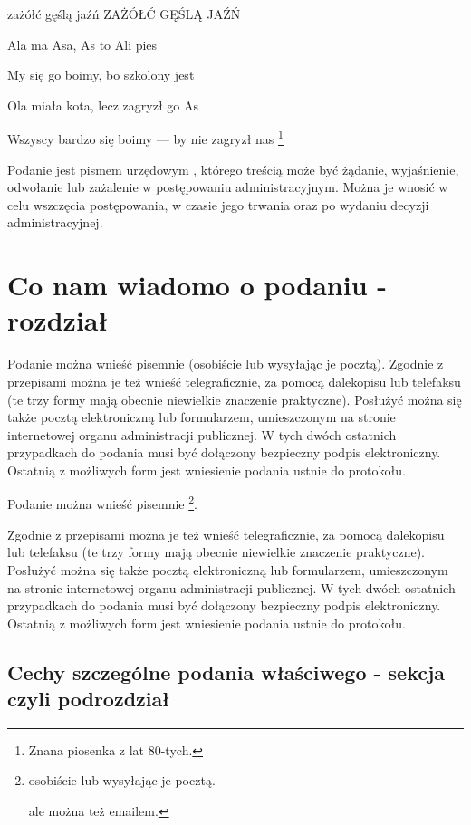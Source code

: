 zażółć gęślą jaźń ZAŻÓŁĆ GĘŚLĄ JAŹŃ

Ala ma Asa, As to Ali pies

My się go boimy, bo szkolony jest

Ola miała kota, lecz zagryzł go As

Wszyscy bardzo się boimy --- by nie zagryzł nas \footnote{Znana piosenka
  z lat 80-tych.}

Podanie jest pismem urzędowym , którego treścią może być żądanie,
wyjaśnienie, odwołanie lub zażalenie w postępowaniu administracyjnym.
Można je wnosić w celu wszczęcia postępowania, w czasie jego trwania
oraz po wydaniu decyzji administracyjnej.

\hypertarget{co-nam-wiadomo-o-podaniu---rozdziaux142}{%
\section{Co nam wiadomo o podaniu -
rozdział}\label{co-nam-wiadomo-o-podaniu---rozdziaux142}}

Podanie można wnieść pisemnie (osobiście lub wysyłając je pocztą).
Zgodnie z przepisami można je też wnieść telegraficznie, za pomocą
dalekopisu lub telefaksu (te trzy formy mają obecnie niewielkie
znaczenie praktyczne). Posłużyć można się także pocztą elektroniczną lub
formularzem, umieszczonym na stronie internetowej organu administracji
publicznej. W tych dwóch ostatnich przypadkach do podania musi być
dołączony bezpieczny podpis elektroniczny. Ostatnią z możliwych form
jest wniesienie podania ustnie do protokołu.

Podanie można wnieść pisemnie \footnote{osobiście lub wysyłając je
  pocztą.

  ale można też emailem.}.

Zgodnie z przepisami można je też wnieść telegraficznie, za pomocą
dalekopisu lub telefaksu (te trzy formy mają obecnie niewielkie
znaczenie praktyczne). Posłużyć można się także pocztą elektroniczną lub
formularzem, umieszczonym na stronie internetowej organu administracji
publicznej. W tych dwóch ostatnich przypadkach do podania musi być
dołączony bezpieczny podpis elektroniczny. Ostatnią z możliwych form
jest wniesienie podania ustnie do protokołu.

\hypertarget{cechy-szczeguxf3lne-podania-wux142aux15bciwego---sekcja-czyli-podrozdziaux142}{%
\subsection{Cechy szczególne podania właściwego - sekcja czyli
podrozdział}\label{cechy-szczeguxf3lne-podania-wux142aux15bciwego---sekcja-czyli-podrozdziaux142}}

